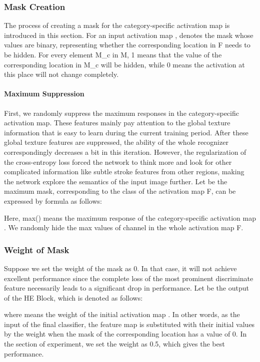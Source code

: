 \documentclass[manuscript,screen]{acmart}
\begin{document}
\subsubsection{Mask Creation} The process of creating a mask for the category-specific activation map is introduced in this section. For an input activation map ,  denotes the mask whose values are binary, representing whether the corresponding location in F needs to be hidden. For every element M\_c in M, 1 means that the value of the corresponding location in M\_c will be hidden, while 0 means the activation at this place will not change completely.

\paragraph{Maximum Suppression} First, we randomly suppress the maximum responses in the category-specific activation map. These features mainly pay attention to the global texture information that is easy to learn during the current training period. After these global texture features are suppressed, the ability of the whole recognizer correspondingly decreases a bit in this iteration. However, the regularization of the cross-entropy loss forced the network to think more and look for other complicated information like subtle stroke features from other regions, making the network explore the semantics of the input image further. Let  be the maximum mask, corresponding to the  class of the activation map F, can be expressed by formula as follows:



Here, max() means the maximum response of the category-specific activation map . We randomly hide the max values of  channel in the whole activation map F.


\subsubsection{Weight of Mask} Suppose we set the weight of the mask  as 0. In that case, it will not achieve excellent performance since the complete loss of the most prominent discriminate feature necessarily leads to a significant drop in performance. Let  be the output of the HE Block, which is denoted as follows:



where  means the weight of the initial activation map . In other words, as the input of the final classifier, the feature map is substituted with their initial values by the weight  when the mask of the corresponding location has a value of 0. In the section of experiment, we set the weight as 0.5, which gives the best performance.
\end{document}
